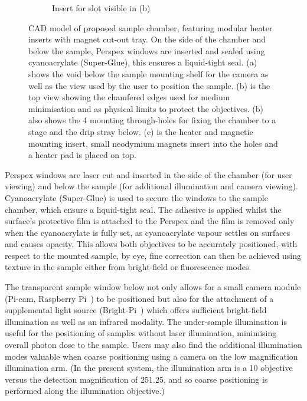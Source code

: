 \begin{figure}
\begin{subfigure}[b]{0.4\linewidth}
         \caption{Insert for slot visible in (b)}\label{fig:chamber_slide}
    \end{subfigure}
    \caption[\gls{CAD} model of proposed sample chamber]{\gls{CAD} model of proposed sample chamber, featuring modular heater inserts with magnet cut-out tray.
    On the side of the chamber and below the sample, Perspex windows are inserted and sealed using cyanoacrylate (Super-Glue), this ensures a liquid-tight seal.
    (a) shows the void below the sample mounting shelf for the camera as well as the view used by the user to position the sample.
    (b) is the top view showing the chamfered edges used for medium minimisation and as physical limits to protect the objectives.
    (b) also shows the 4 mounting through-holes for fixing the chamber to a stage and the drip stray below.
    (c) is the heater and magnetic mounting insert, small neodymium magnets insert into the holes and a heater pad is placed on top.
    }
\end{figure}

Perspex windows are laser cut and inserted in the side of the chamber (for user viewing) and below the sample (for additional illumination and camera viewing).
Cyanoacrylate (Super-Glue) is used to secure the windows to the sample chamber, which ensure a liquid-tight seal.
The adhesive is applied whilst the surface's protective film is attached to the Perspex and the film is removed only when the cyanoacrylate is fully set, as cyanoacrylate vapour settles on surfaces and causes opacity.
This allows both objectives to be accurately positioned, with respect to the mounted sample, by eye, fine correction can then be achieved using texture in the sample either from bright-field or fluorescence modes.

The transparent sample window below not only allows for a small camera module (Pi-cam, Raspberry Pi~\cite{BrightPiBright}) to be positioned
but also for the attachment of a supplemental light source (Bright-Pi~\cite{CameraModuleV2}) which offers sufficient bright-field illumination as well as an infrared modality.
The under-sample illumination is useful for the positioning of samples without laser illumination, minimising overall photon dose to the sample.
Users may also find the additional illumination modes valuable when coarse positioning using a camera on the low magnification illumination arm.
(In the present system, the illumination arm is a \SI{10}{\times} objective versus the detection magnification of \SI{25}{\times}\SI{1.25}{\times}, and so coarse positioning is performed along the illumination objective.)

